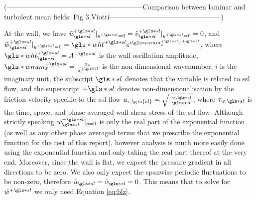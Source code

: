 (-----------------------------------------------------------Comparison between laminar and turbulent mean fields: Fig 3 Viotti------------------------------------------------)

At the wall, we have $\tilde{u}\ssl\ps\rvert_{y\ps=0}=\tilde{v}\ssl\ps\rvert_{y\ps=0}=0$, and $\tilde{w}\ssl\ps\rvert_{y\ps=0}=\gls*{wht}\ps e^{i \gls*{wnum}_x\ps x\ps}$, where $\gls*{wht}\ps\ssl=A\ps$ is the wall oscillation amplitude, $\gls*{wnum}_x\ps = \frac{2\pi}{\lambda_x\ps}$ is the non-dimensional wavenumber, $i$ is the imaginary unit, the subscript $\gls*{sl}$ denotes that the variable is related to \gls{ssl} flow, and the superscript $+\gls*{sl}$ denotes non-dimensionalisation by the friction velocity specific to the \gls{ssl} flow $u_{\tau,\gls{sl}}=\sqrt{\frac{\tau_{w,\gls*{sl}}}{\gls*{ro}}} $, where $\tau_{w,\gls*{sl}}$ is the time, space, and phase averaged wall shear stress of the  \gls{ssl} flow. Although strictly speaking $\tilde{w}\ssl\ps\rvert_{y=0}$ is only the real part of the exponential function (as well as any other phase averaged terms that we prescribe the exponential function for the rest of this report), however analysis is much more easily done using the exponential function and only taking the real part thereof at the very end. Moreover, since the wall is flat, we expect the pressure gradient in all directions to be zero. We also only expect the spanwise periodic fluctuations to be non-zero, therefore $\tilde{u}\ssl=\tilde{v}\ssl=0  $. This means that to solve for $\tilde{w}\ps$ we only need Equation \eqref{eq:blz}.

